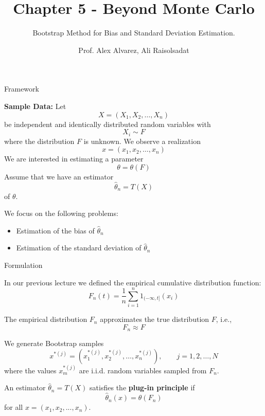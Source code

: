 \documentclass[8pt]{beamer}
\title{Chapter 5 - Beyond Monte Carlo}
\subtitle{Bootstrap Method for Bias and Standard Deviation Estimation.}
\author{Prof. Alex Alvarez, Ali Raisolsadat}
\institute{School of Mathematical and Computational Sciences \\ University of Prince Edward Island}
\date{} %
\begin{document}
\maketitle

\begin{frame}{Framework}

\textbf{Sample Data:}  
Let 
\[
X = (X_1, X_2, \ldots, X_n)
\]
be independent and identically distributed random variables with
\[
X_i \sim F
\]
where the distribution $F$ is unknown. We observe a realization
\[
x = (x_1, x_2, \ldots, x_n)
\]
We are interested in estimating a parameter
\[
\theta = \theta(F)
\]
Assume that we have an estimator 
\[
\widehat{\theta}_n = T(X)
\]
of $\theta$.

We focus on the following problems:
\begin{itemize}
\item Estimation of the bias of $\widehat{\theta}_n$
\item Estimation of the standard deviation of $\widehat{\theta}_n$
\end{itemize}

\end{frame}

\begin{frame}{Formulation}

In our previous lecture we defined the empirical cumulative distribution function:
\[
F_n(t)=\frac{1}{n}\sum_{i=1}^n 1_{(-\infty,t]}(x_i)
\]

The empirical distribution $F_n$ approximates the true distribution $F$, i.e.,
\[
F_n \approx F
\]

We generate Bootstrap samples
\[
x^{*(j)} = \left(x^{*(j)}_1, x^{*(j)}_2, \ldots, x^{*(j)}_n\right), 
\qquad j=1,2,\ldots,N
\]
where the values $x^{*(j)}_m$ are i.i.d. random variables sampled from $F_n$.

An estimator $\widehat{\theta}_n = T(X)$ satisfies the \textbf{plug-in principle} if
\[
\widehat{\theta}_n(x) = \theta(F_n)
\]
for all $x=(x_1,x_2,...,x_n)$.

\end{frame}
\end{document}
